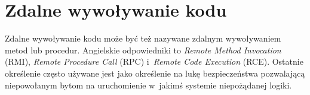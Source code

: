 %
%
%
%
%
%
%
%

\section{Zdalne wywoływanie kodu}
Zdalne wywoływanie kodu może być też nazywane zdalnym wywoływaniem metod lub procedur. Angielskie odpowiedniki to \emph{Remote Method Invocation} (RMI), \emph{Remote Procedure Call} (RPC) i~\emph{Remote Code Execution} (RCE). Ostatnie określenie często używane jest jako określenie na lukę bezpieczeństwa pozwalającą niepowołanym bytom na uruchomienie w~jakimś systemie niepożądanej logiki.

